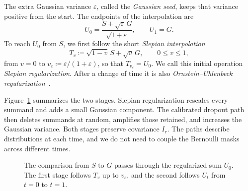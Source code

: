 \documentclass[11pt,letterpaper]{article}
\theoremstyle{remark}
\begin{document}
The extra Gaussian variance \(\varepsilon\), called the
\emph{Gaussian seed}, keeps that variance positive from the start.
The endpoints of the interpolation are
\[
 U_0=\frac{S+\sqrt\varepsilon\,G}{\sqrt{1+\varepsilon}},
 \qquad U_1=G.
\]
To reach \(U_0\) from \(S\), we first follow the short
\emph{Slepian interpolation}
\[
 T_v\coloneqq\sqrt{1-v}\,S+\sqrt v\,G,\qquad 0\le v\le1,
\]
from \(v=0\) to \(v_\varepsilon\coloneqq
\varepsilon/(1+\varepsilon)\), so that \(T_{v_\varepsilon}=U_0\).
We call this initial operation \emph{Slepian regularization}.
After a change of time it is also
\emph{Ornstein--Uhlenbeck regularization}~\cite[Theorem~4.12]{Nourdin2012}.

Figure~\ref{fig:two-stage-path} summarizes the two stages. Slepian
regularization rescales every summand and adds a small Gaussian component.
The calibrated dropout path then deletes summands at random, amplifies
those retained, and increases the Gaussian variance. Both stages preserve
covariance \(I_r\). The paths describe distributions at each time, and
we do not need to couple the Bernoulli masks across different times.

\begin{figure}[htbp]
\centering
{}
\caption{The comparison from \(S\) to \(G\) passes through the regularized
sum \(U_0\). The first stage follows \(T_v\) up to \(v_\varepsilon\),
and the second follows \(U_t\) from \(t=0\) to \(t=1\).}
\label{fig:two-stage-path}
\end{figure}
\end{document}
